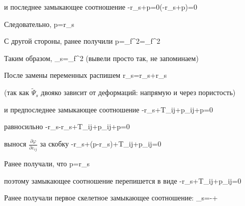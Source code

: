 \documentclass[main.tex]{subfiles}
\begin{document}
и последнее замыкающее соотношение
\beq
-r_s+p=0\Leftrightarrow \left(-r_s+p\right)=0
\eeq

Следовательно,
\beq
p=r_s
\eeq

С другой стороны, ранее получили
\beq
p=\rho_f^2=\rho_f^2
\eeq

Таким образом,
\beq
\varphi\rho_s=\rho_f^2
\eeq
(вывели просто так, не запоминаем)

После замены переменных распишем 
\beq
r_s=r_s+r_s
\eeq

(так как $\tilde{\Psi}_s$ двояко зависит от деформаций: напрямую и через пористость)

и предпоследнее замыкающее соотношение
\beq
-r_s+T_{ij}+p\varphi\delta_{ij}+p=0
\eeq

равносильно
\beq
-r_s-r_s+T_{ij}+p\varphi\delta_{ij}+p=0
\eeq

вынося $\displaystyle{}\frac{\partial\varphi}{\partial\varepsilon_{ij}}$ за скобку
\beq
-r_s+\left(p-r_s\right)+T_{ij}+p\varphi\delta_{ij}=0
\eeq

Ранее получали, что
\beq
p=r_s
\eeq

поэтому замыкающее соотношение перепишется в виде
\beq
-r_s+T_{ij}+p\varphi\delta_{ij}=0
\eeq

Ранее получали первое скелетное замыкающее соотношение:
\beq
\eta_s=-+\frac{\partial\varphi}{\partial\theta}
\eeq
\end{document}
